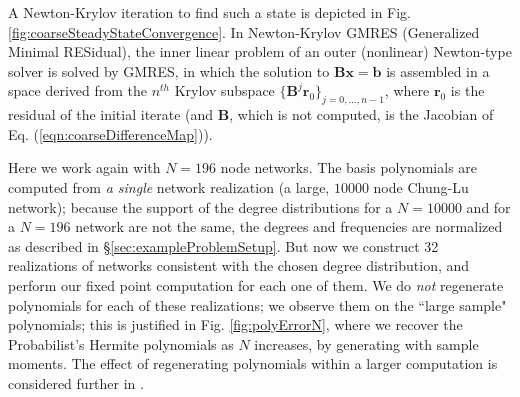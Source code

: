 \documentclass[numbers]{frontiersSCNS}
\renewcommand{\vec}[1]{\bm{#1}}
\newcommand{\mat}[1]{{\mathbf{#1}}}
\newcommand{\numNodes}{{N}}
\newcommand{\figRef}[1]{Fig. \ref{fig:#1}}
\newcommand{\eqnRef}[1]{Eq. (\ref{eqn:#1})}
\newcommand{\secRef}[1]{\S\ref{sec:#1}}
\newcommand{\baseNVal}{196}
\newcommand{\numReplicatesVal}{32}
\newcommand{\bigBigNVal}{10000}
\begin{document}
A Newton-Krylov iteration to find such a state is depicted in
\figRef{coarseSteadyStateConvergence}.
%
In Newton-Krylov GMRES (Generalized Minimal RESidual),
the inner linear problem of an outer (nonlinear) Newton-type solver
is solved by GMRES,
in which the solution to $\mat B \vec x = \vec b$
is assembled in a space
derived from the $n^{th}$ Krylov subspace $\{\mat B^j \vec r_0 \}_{j=0,\ldots,n-1}$,
where $\vec r_0$ is the residual of the initial iterate
(and $\mat B$, which is not computed, is the Jacobian of \eqnRef{coarseDifferenceMap}).

Here we work again with $\numNodes=\baseNVal$ node networks.
%
The basis polynomials are computed from {\em a single} network realization (a large,
$\bigBigNVal$ node Chung-Lu network); because the support of the degree distributions for
a $\numNodes=\bigBigNVal$ and for a $\numNodes=\baseNVal$ network are not the same,
the degrees and frequencies are normalized as described in \secRef{exampleProblemSetup}.
%
But now we construct \numReplicatesVal{} realizations of networks consistent with the chosen degree
distribution, and perform our fixed point computation for each one of them.
%
We do {\em not} regenerate polynomials for each of these realizations; we observe them
on the ``large sample" polynomials; this is justified in \figRef{polyErrorN},
where we recover the Probabilist's Hermite polynomials as $\numNodes$ increases,
by generating with sample moments.
%
The effect of regenerating polynomials within a larger computation
is considered further in \cite{Rajendran2012,Rajendran2016}.
\end{document}
